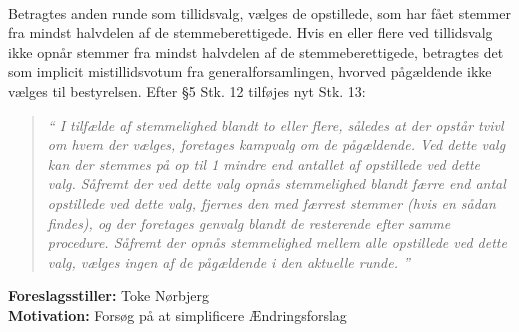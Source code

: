 \documentclass[a4paper,12pt,danish]{article}
\newcommand\cit[1]{
    \begin{quote}
        \textit{``#1''}
    \end{quote}
}
\newcommand\who[1]{
    \textbf{Foreslagsstiller:} #1\\
}
\newcommand\why[1]{
    \textbf{Motivation:} #1\\
}
\begin{document}
{{{            \\
            Betragtes anden runde som tillidsvalg, vælges de opstillede, som har fået stemmer fra mindst halvdelen af de stemmeberettigede. Hvis en eller flere ved tillidsvalg ikke opnår stemmer fra mindst halvdelen af de stemmeberettigede, betragtes det som implicit mistillidsvotum fra generalforsamlingen, hvorved pågældende ikke vælges til bestyrelsen.
        }
        Efter \S5 Stk. 12 tilføjes nyt Stk. 13:
        \cit{
            I tilfælde af stemmelighed blandt to eller flere, således at der opstår tvivl om hvem der vælges, foretages kampvalg om de pågældende. Ved dette valg kan der stemmes på op til 1 mindre end antallet af opstillede ved dette valg. Såfremt der ved dette valg opnås stemmelighed blandt færre end antal opstillede ved dette valg, fjernes den med færrest stemmer (hvis en sådan findes), og der foretages genvalg blandt de resterende efter samme procedure. Såfremt der opnås stemmelighed mellem alle opstillede ved dette valg, vælges ingen af de pågældende i den aktuelle runde.
        }
        \who{Toke Nørbjerg}
        \why{Forsøg på at simplificere Ændringsforslag }
    }
}
\end{document}
